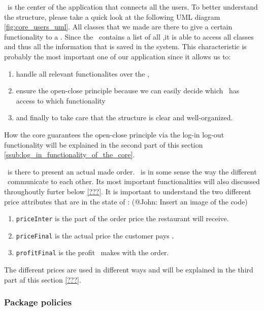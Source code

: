 \Core~is the center of the application that connects all the users. To better understand the structure, please take a quick look at the following UML diagram \ref{fig:core_users_uml}. All classes that we made are there to give a certain functionality to a \User. Since the \Core~contains a list of all \User,it is able to access all classes and thus all the information that is saved in the system. This characteristic is probably the most important one of our application since it allows us to:

\begin{enumerate}
	\item handle all relevant functionalites over the \Core,
	\item ensure the open-close principle because we can easily decide which \User~has access to which functionality 
	\item and finally to take care that the structure is clear and well-organized.
\end{enumerate}

How the core guarantees the open-close principle via the log-in log-out functionality will be explained in the second part of this section \ref{ssub:log_in_functionality_of_the_core}.

\Order~is there to present an actual made order. \Order~is in some sense the way the different \User~communicate to each other. Its most important functionalities will also discussed throughoutly furter below \ref{???}. It is important to understand the two different price attributes that are in the state of \Order: (@John: Insert an image of the code)

\begin{enumerate}
	\item \lstinline|priceInter| is the part of the order price the restaurant will receive.
	\item \lstinline|priceFinal| is the actual price the customer pays \MyFoodora.
	\item \lstinline|profitFinal| is the profit \MyFoodora~makes with the order. 
\end{enumerate}

The different prices are used in different ways and will be explained in the third part af this section \ref{???}.


\subsubsection{Package policies} %
\label{ssub:policies}

